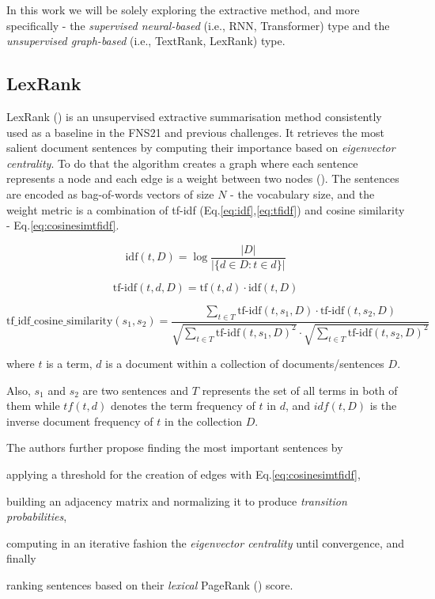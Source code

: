 In this work we will be solely exploring the extractive method, and more specifically - the \emph{supervised neural-based} (i.e., RNN, Transformer) type and the \emph{unsupervised graph-based} (i.e., TextRank, LexRank) type.


\subsection{LexRank}\label{subsec:lexrank}
LexRank (\cite{Erkan2004LexRankGC}) is an unsupervised extractive summarisation method consistently used as a baseline in the FNS21 and previous challenges.
It retrieves the most salient document sentences by computing their importance based on \emph{eigenvector centrality}.
To do that the algorithm creates a graph where each sentence represents a node and each edge is a weight between two nodes (\cite{Shearing2020AutomatedTS}).
The sentences are encoded as bag-of-words vectors of size $N$ - the vocabulary size, and the weight metric is a combination of tf-idf (Eq.\ref{eq:idf},\ref{eq:tfidf}) and cosine similarity - Eq.\ref{eq:cosinesimtfidf}.

\begin{equation}
    \text{idf}(t, D) = \log \frac{|D|}{|\{d \in D : t \in d\}|} \label{eq:idf}
\end{equation}

\begin{equation}
    \text{tf-idf}(t, d, D) = \text{tf}(t, d) \cdot \text{idf}(t, D)
    \label{eq:tfidf}
\end{equation}

\begin{equation}
    \text{tf\_idf\_cosine\_similarity}(s_1, s_2) = \frac{\sum_{t \in T} \text{tf-idf}(t, s_1, D) \cdot \text{tf-idf}(t, s_2, D)}{ \sqrt{\sum_{t \in T} \text{tf-idf}(t, s_1, D)^2} \cdot \sqrt{\sum_{t \in T} \text{tf-idf}(t, s_2, D)^2}}
    \label{eq:cosinesimtfidf}
\end{equation}

where $t$ is a term, $d$ is a document within a collection of documents/sentences $D$.

Also, $s_1$ and $s_2$ are two sentences and $T$ represents the set of all terms in both of them while $tf(t, d)$ denotes the term frequency of $t$ in $d$, and $idf(t, D)$ is the inverse document frequency of $t$ in the collection $D$.

The authors further propose finding the most important sentences by \begin{enumerate*}
    \item applying a threshold for the creation of edges with Eq.\ref{eq:cosinesimtfidf},
    \item building an adjacency matrix and normalizing it to produce \emph{transition probabilities},
    \item computing in an iterative fashion the \emph{eigenvector centrality} until convergence, and finally
    \item ranking sentences based on their \emph{lexical} PageRank (\cite{page1998anatomy}) score.
\end{enumerate*}